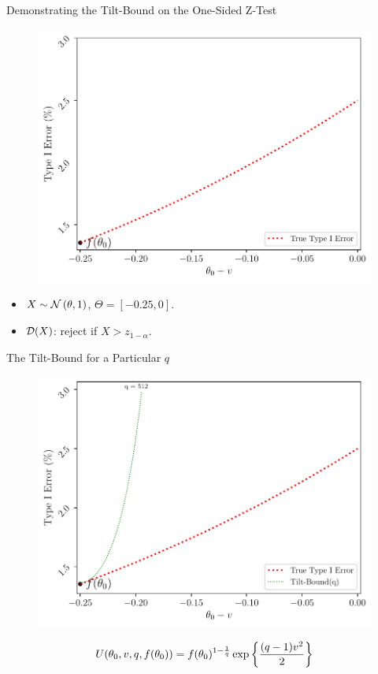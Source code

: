 \begin{frame}{Demonstrating the Tilt-Bound on the One-Sided Z-Test}
\begin{figure}
    \centering
    \includegraphics[width=0.85\linewidth]{figs/greens_up_tie.pdf}
\end{figure}
\begin{itemize}
    \item $X \sim \mathcal{N}\left( \theta, 1 \right)$, $\Theta = [-0.25, 0]$.
    \item $\mathcal{D}(X)$: reject if $X > z_{1-\alpha}$.
\end{itemize}
\end{frame}

\begin{frame}{The Tilt-Bound for a Particular $q$}
\begin{figure}
    \centering
    \includegraphics[width=0.85\linewidth]{figs/greens_up_one_q.pdf}
\end{figure} 
\begin{equation*}
    U(\theta_0, v, q, f(\theta_0))
    =
    f(\theta_0)^{1 - \frac{1}{q}} 
    \exp\left\{\frac{(q - 1) v^2}{2}\right\}
\end{equation*}
\end{frame}

